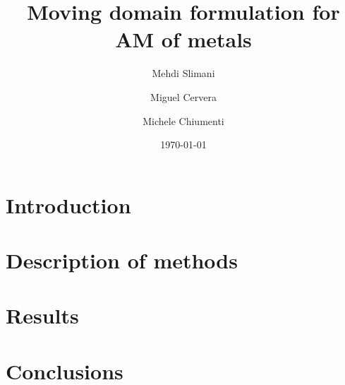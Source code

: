 \documentclass{elsarticle}
\title{Moving domain formulation for AM of metals}
\author[1]{Mehdi Slimani}
\author[1]{Miguel Cervera}
\author[1]{Michele Chiumenti}
\affiliation[1]{organization={CIMNE}}
\date{\today}
\begin{document}
\begin{abstract}
  
\end{abstract}

\maketitle

\section{Introduction}\label{sec:intro}


\section{Description of methods}\label{sec:methodman}


\section{Results}\label{sec:results}


\section{Conclusions}\label{sec:conclusions}




\end{document}
